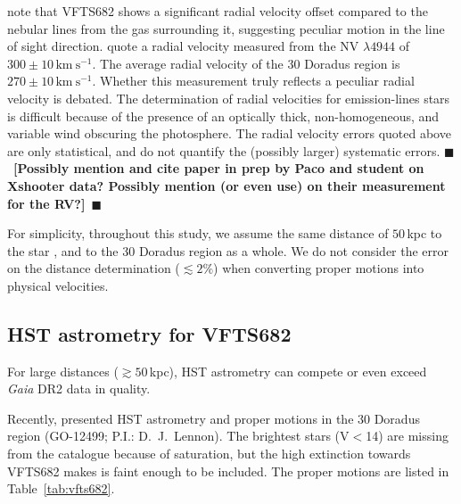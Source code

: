 \documentclass[apjl,twocolumn]{emulateapj}
\newcommand{\todo}[1]{{\large $\blacksquare$~\textbf{\color{red}[#1]}}~$\blacksquare$}
\newcommand{\kms}{{\,\mathrm{km\ s^{-1}}}}
\DeclareRobustCommand{\Tabref}[1]{Table~\ref{#1}}
\begin{document}
\cite{bressert:12} note that VFTS682 shows a significant radial
velocity offset compared to the nebular lines from the gas surrounding
it, suggesting peculiar motion in the line of sight direction.
\citet{bestenlehner:11} quote a radial velocity measured from the
N{\footnotesize V} $\lambda4944$ of   $300\pm10\kms$. The average radial velocity of the 30 Doradus region is 
$270\pm10\kms$. Whether this measurement truly reflects a peculiar radial velocity is debated. The determination of radial velocities for emission-lines stars is difficult because of the presence of an optically thick, non-homogeneous, and variable wind obscuring the photosphere. The radial velocity errors quoted above are only statistical, and do not quantify the (possibly larger)
systematic errors.  \todo{Possibly mention and cite paper in prep by Paco and student on Xshooter data?  Possibly mention (or even use) on their measurement for the RV?}


For simplicity, throughout this study, we assume the same
distance of $50$\,kpc to the star \citep[][]{pietrzynski:13}, and to
the 30 Doradus region as a whole. We do not consider the error on
the distance determination ($\lesssim2\%$) when converting proper motions into
physical velocities.

\subsection{HST astrometry for VFTS682}


For large distances ($\gtrsim50$\,kpc), HST astrometry can compete or even exceed \emph{Gaia} DR2 data in quality.

Recently, \citet{platais:18} presented HST astrometry and proper
motions in the 30 Doradus region (GO-12499; P.I.: D.~J.~Lennon). The
brightest stars (V$<$14) are missing from the catalogue because of
saturation, but the high extinction towards VFTS682 makes is faint
enough to be included. %
The  proper motions are
listed in \Tabref{tab:vfts682}. 
\end{document}
